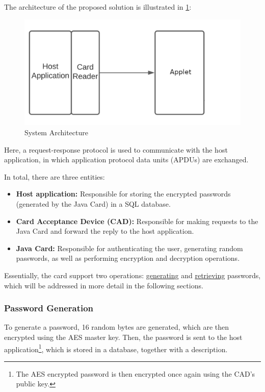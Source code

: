 \documentclass[a4paper, 11pt]{article}
\begin{document}
    The architecture of the proposed solution is illustrated in \cref{fig:arch}:

    \begin{figure}[H]
        \centering
        \includegraphics[width=.6\textwidth]{img/arch}
        \caption{System Architecture}
        \label{fig:arch}
    \end{figure}

    Here, a request-response protocol is used to communicate with the host application, in which application protocol data
    units (APDUs) are exchanged.

    In total, there are three entities:

    \begin{itemize}
        \item \textbf{Host application:} Responsible for storing the encrypted passwords (generated by the Java Card) in
        a SQL database.
        \item \textbf{Card Acceptance Device (CAD):} Responsible for making requests to the Java Card and
        forward the reply to the host application.
        \item \textbf{Java Card:} Responsible for authenticating the user, generating random passwords, as well as
        performing encryption and decryption operations.
    \end{itemize}

    Essentially, the card support two operations: \uline{generating} and \uline{retrieving} passwords, which will be
    addressed in more detail in the following sections.

    \subsubsection{Password Generation}

    To generate a password, 16 random bytes are generated, which are then encrypted using the AES master key.
    Then, the password is sent to the host application\footnote{The AES encrypted password is then encrypted once again
    using the CAD's public key.}, which is stored in a database, together with a description.
\end{document}
